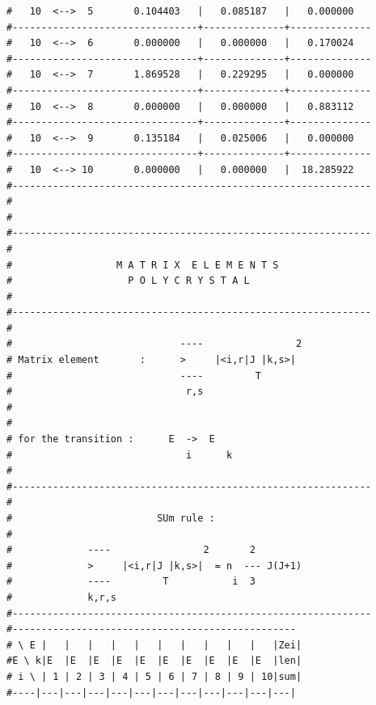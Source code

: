 \begin{enumerate}
{\begin{verbatim}
#   10  <-->  5       0.104403   |   0.085187   |   0.000000   
#--------------------------------+--------------+--------------
#   10  <-->  6       0.000000   |   0.000000   |   0.170024   
#--------------------------------+--------------+--------------
#   10  <-->  7       1.869528   |   0.229295   |   0.000000   
#--------------------------------+--------------+--------------
#   10  <-->  8       0.000000   |   0.000000   |   0.883112   
#--------------------------------+--------------+--------------
#   10  <-->  9       0.135184   |   0.025006   |   0.000000   
#--------------------------------+--------------+--------------
#   10  <--> 10       0.000000   |   0.000000   |  18.285922   
#-------------------------------------------------------------- 
#
#
#-------------------------------------------------------------- 
#                                                              
#                  M A T R I X  E L E M E N T S                
#                    P O L Y C R Y S T A L                     
#                                                              
#--------------------------------------------------------------
#                                                              
#                             ----                2            
# Matrix element       :      >     |<i,r|J |k,s>|             
#                             ----         T                   
#                              r,s                             
#                                                              
#                                                              
# for the transition :      E  ->  E                           
#                              i      k                        
#                                                              
#--------------------------------------------------------------
#                                                              
#                         SUm rule :                           
#                                                              
#             ----                2       2                    
#             >     |<i,r|J |k,s>|  = n  --- J(J+1)            
#             ----         T           i  3                    
#             k,r,s                                            
#-------------------------------------------------------------- 
#------------------------------------------------- 
# \ E |   |   |   |   |   |   |   |   |   |   |Zei|
#E \ k|E  |E  |E  |E  |E  |E  |E  |E  |E  |E  |len|
# i \ | 1 | 2 | 3 | 4 | 5 | 6 | 7 | 8 | 9 | 10|sum|
#----|---|---|---|---|---|---|---|---|---|---|---|

\end{verbatim}}
\end{enumerate}
